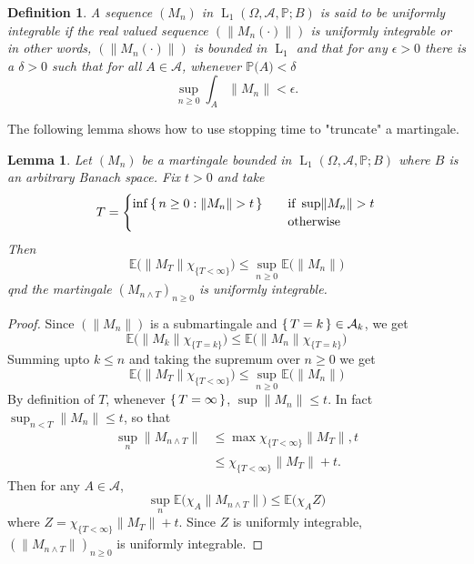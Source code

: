 \documentclass[]{report}
\newcommand{\lp}[2]{\operatorname{L}_{#1}({#2})}
\newcommand*{\Normu}[1]{\lVert {#1} \rVert}
\newcommand*{\ext}[1]{\mathbb{E}\big({#1}\big)}
\renewcommand{\P}[1]{\mathbb{P}\big({#1}\big)}
\newcommand{\pspc}{\Omega,\mathcal{A},\mathbb{P}}
\newtheorem{lemma}[theorem]{Lemma}
\newtheorem{Def}[theorem]{Definition}
\begin{document}
\begin{Def}
	A sequence $(M_n)$ in $\lp{1}{\pspc;B}$ is said to be uniformly integrable if the real valued sequence $(\Normu{M_n(\cdot)})$ is uniformly integrable or in other words, $(\Normu{M_n(\cdot)})$ is bounded in $\operatorname{L}_1$ and that for any $\epsilon>0$ there is a $\delta>0$ such that for all $A \in \mathcal{A}$, whenever $\P{A}< \delta$ 
	\[ \sup\limits_{n\geq 0} \int_A \Normu{M_n} < \epsilon. \]
\end{Def}

The following lemma shows how to use stopping time to "truncate" a martingale. 

\begin{lemma}
	Let $(M_n)$ be a martingale bounded in $\lp{1}{\pspc;B}$ where $B$ is an arbitrary Banach space. Fix $t > 0$ and take 
	\[ T= \begin{cases}
		\inf\set{n\geq 0: \Normu{M_n}>t} \quad &\text{if }\sup\Normu{M_n}>t\\
		&\text{otherwise}
	\end{cases} \] 
	Then 
	\[ \ext{\Normu{M_T}\chi_{\{T<\infty\}}}\leq \sup\limits_{n\geq0}\ext{\Normu{M_n}} \]
	qnd the martingale $(M_{n\wedge T})_{n\geq0}$ is uniformly integrable. 
\end{lemma}
\begin{proof}
	Since $(\Normu{M_n})$ is a submartingale and $\set{T=k}\in \mathcal{A}_k $, we get 
	\[ \ext{\Normu{M_k}\chi_{\{T=k\}}} \leq \ext{\Normu{M_n}\chi_{\{T=k\}}} \]
	Summing upto $k\leq n$ and taking the supremum over $n\geq 0$ we get 
	\[ \ext{\Normu{M_T}\chi_{\{T<\infty\}}}\leq \sup\limits_{n\geq0}\ext{\Normu{M_n}} \]
	By definition of $T$, whenever $\set{T=\infty}$, $\sup \Normu{M_n}\leq t$. In fact $\sup_{n<T}\Normu{M_n}\leq t$, so that 
	\[
	\begin{aligned}
		\sup_n \Normu{M_{n\wedge T}} & \leq \max{\chi_{\{T<\infty\}}\Normu{M_T},t}\\
		& \leq \chi_{\{T<\infty\}}\Normu{M_T}+t.
	\end{aligned}
	\]
	Then for any $A \in \mathcal{A}$, 
	\[ \sup_n \ext{\chi_A\Normu{M_{n\wedge T}}} \leq \ext{\chi_A Z} \]
	where $Z=\chi_{\{T<\infty\}}\Normu{M_T}+t$. Since $Z$ is uniformly integrable, $(\Normu{M_{n\wedge T}})_{n\geq0}$ is uniformly integrable.
\end{proof}
\end{document}
